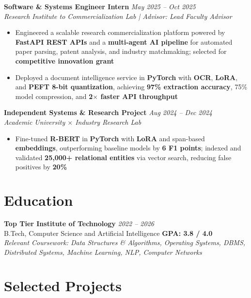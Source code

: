 \documentclass[10pt]{article}
\begin{document}
\textbf{Software \& Systems Engineer Intern} \hfill \textcolor{subheadingcolor}{\textit{May 2025 -- Oct 2025}} \\
\textit{Research Institute to Commercialization Lab | Advisor: Lead Faculty Advisor}
\begin{itemize}
    \item Engineered a scalable research commercialization platform powered by \textbf{FastAPI REST APIs} and a \textbf{multi-agent AI pipeline} for automated paper parsing, patent analysis, and industry matchmaking; selected for \textbf{competitive innovation grant}
    \item Deployed a document intelligence service in \textbf{PyTorch} with \textbf{OCR}, \textbf{LoRA}, and \textbf{PEFT 8-bit quantization}, achieving \textbf{97\% extraction accuracy}, 75\% model compression, and \textbf{2$\times$ faster API throughput}
\end{itemize}
\vspace{-0.3em}

\textbf{Independent Systems \& Research Project} \hfill \textcolor{subheadingcolor}{\textit{Aug 2024 -- Dec 2024}} \\
\textit{Academic University $\times$ Industry Research Lab}
\begin{itemize}
    \item Fine-tuned \textbf{R-BERT} in \textbf{PyTorch} with \textbf{LoRA} and span-based \textbf{embeddings}, outperforming baseline models by \textbf{6 F1 points}; indexed and validated \textbf{25,000+ relational entities} via vector search, reducing false positives by \textbf{20\%}
\end{itemize}
\vspace{-0.45em}

\section*{Education}
\textbf{Top Tier Institute of Technology} \hfill \textit{2022 -- 2026} \\
B.Tech, Computer Science and Artificial Intelligence \hfill \textbf{GPA: 3.8 / 4.0} \\[0.05em]
{\small \textit{Relevant Coursework: Data Structures \& Algorithms, Operating Systems, DBMS, Distributed Systems, Machine Learning, NLP, Computer Networks}}
\vspace{-0.35em}

\section*{Selected Projects}
\end{document}
